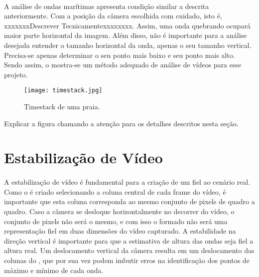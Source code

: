 \paragraph{}A análise de ondas marítimas apresenta condição similar a descrita anteriormente. Com a posição da câmera escolhida com cuidado, isto é, xxxxxxxDescrever Tecnicamentexxxxxxxx. Assim, uma onda quebrando ocupará maior parte horizontal da imagem. Além disso, não é importante para a análise desejada entender o tamanho horizontal da onda, apenas o seu tamanho vertical. Precisa-se apenas determinar o seu ponto mais baixo e seu ponto mais alto. Sendo assim, o \timestack mostra-se um método adequado de análise de vídeos para esse projeto.
\begin{figure}[h]
\begin{center}
  \texttt{[image: timestack.jpg]}
  \caption[\small{Timestack em nível de cinza gerado a partir de um vídeo estabilizado de uma praia.}]{\label{FigTimestack} \small{Timestack de uma praia.}}
\end{center}
\end{figure}
Explicar a figura chamando a atenção para os detalhes descritos nesta seção.
\section{Estabilização de Vídeo}
\paragraph{}A estabilização de vídeo é fundamental para a criação de um \timestack fiel ao cenário real. Como o \timestack é criado selecionando a coluna central de cada frame do vídeo, é importante que esta coluna corresponda ao mesmo conjunto de pixels de quadro a quadro. Caso a câmera se desloque horizontalmente no decorrer do vídeo, o conjunto de pixels não será o mesmo, e com isso o \timestack formado não será uma representação fiel em duas dimensões do vídeo capturado. A estabilidade na direção vertical é importante para que a estimativa de altura das ondas seja fiel a altura real. Um deslocamento vertical da câmera resulta em um deslocamento das colunas do \timestack, que por sua vez podem imbutir erros na identificação dos pontos de máximo e mínimo de cada onda.
\paragraph{}
